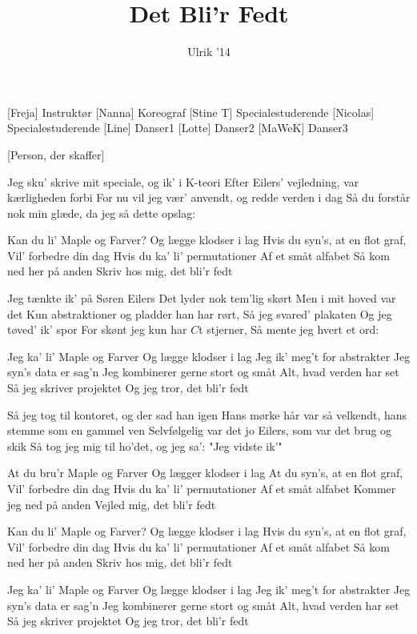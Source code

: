 \documentclass[a4paper,11pt]{article}
\title{Det Bli'r Fedt}
\author{Ulrik '14}
\begin{document}
\maketitle

\begin{roles}
[Freja] Instruktør
[Nanna] Koreograf
[Stine T] Specialestuderende
[Nicolas] Specialestuderende
[Line] Danser1
[Lotte] Danser2
[MaWeK] Danser3
\end{roles}

\begin{props}
[Person, der skaffer]
\end{props}


\begin{song}

 Jeg sku' skrive mit speciale, og ik' i K-teori
Efter Eilers' vejledning, var kærligheden forbi
For nu vil jeg vær' anvendt, og redde verden i dag
Så du forstår nok min glæde, da jeg så dette opslag:

 Kan du li' Maple og Farver?
Og lægge klodser i lag
Hvis du syn's, at en flot graf,
Vil' forbedre din dag
Hvis du ka' li' permutationer
Af et småt alfabet
Så kom ned her på anden
Skriv hos mig, det bli'r fedt

 Jeg tænkte ik' på Søren Eilers
Det lyder nok tem'lig skørt
Men i mit hoved var det
Kun abstraktioner og pladder han har rørt,
Så jeg svared' plakaten
Og jeg tøved' ik' spor
For skønt jeg kun har $C$t stjerner,
Så mente jeg hvert et ord:

 Jeg ka' li' Maple og Farver
Og lægge klodser i lag
Jeg ik' meg't for abstrakter
Jeg syn's data er sag'n
Jeg kombinerer gerne stort og småt
Alt, hvad verden har set
Så jeg skriver projektet
Og jeg tror, det bli'r fedt

 Så jeg tog til kontoret, og der sad han igen
Hans mørke hår var så velkendt, hans stemme som en gammel ven
 Selvfølgelig var det jo Eilers, som var det brug og skik
Så tog jeg mig til ho'det, og jeg sa':
  "Jeg vidste ik'"

 At du bru'r Maple og Farver
Og lægger klodser i lag
At du syn's, at en flot graf,
Vil' forbedre din dag
Hvis du ka' li' permutationer
Af et småt alfabet
Kommer jeg ned på anden
Vejled mig, det bli'r fedt

 Kan du li' Maple og Farver?
Og lægge klodser i lag
Hvis du syn's, at en flot graf,
Vil' forbedre din dag
Hvis du ka' li' permutationer
Af et småt alfabet
Så kom ned her på anden
Skriv hos mig, det bli'r fedt

 Jeg ka' li' Maple og Farver
Og lægge klodser i lag
Jeg ik' meg't for abstrakter
Jeg syn's data er sag'n
Jeg kombinerer gerne stort og småt
Alt, hvad verden har set
Så jeg skriver projektet
Og jeg tror, det bli'r fedt
\end{song}
\end{document}
